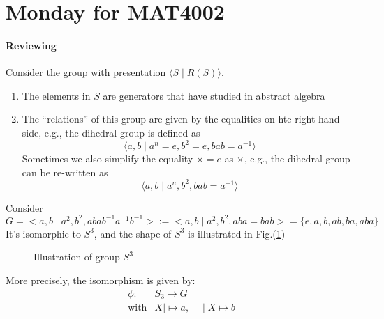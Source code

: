 \section{Monday for MAT4002}
\paragraph{Reviewing}
Consider the group with presentation $\langle S\mid R(S)\rangle$.
\begin{enumerate}
\item
The elements in $S$ are generators that have studied in abstract algebra
\item
The ``relations'' of this group are given by the equalities on hte right-hand side, e.g.,
the dihedral group is defined as
\[
\langle a,b\mid a^n=e,b^2=e,bab=a^{-1}\rangle
\]
Sometimes we also simplify the equality $\times = e$ as $\times$, e.g., the dihedral group can be re-written as
\[
\langle a,b\mid a^n,b^2,bab=a^{-1}\rangle
\]
\end{enumerate}

\begin{example}
Consider 
\[
G=<a,b\mid a^2,b^2,abab^{-1}a^{-1}b^{-1}>:=
<a,b\mid a^2,b^2,aba=bab>
=
\{
e,a,b,ab,ba,aba
\}
\]
It's isomorphic to $S^3$, and the shape of $S^3$ is illustrated in Fig.(\ref{Fig:11:1})
\begin{figure}[H]
	\caption{Illustration of group $S^3$}
	\label{Fig:11:1}
\end{figure}

More precisely, the isomorphism is given by:
\[
\begin{array}{ll}
\phi:&S_3\to G\\
\text{with}&X\mid\mapsto a,\quad
\mid X\mapsto b
\end{array}
\]
\end{example}





